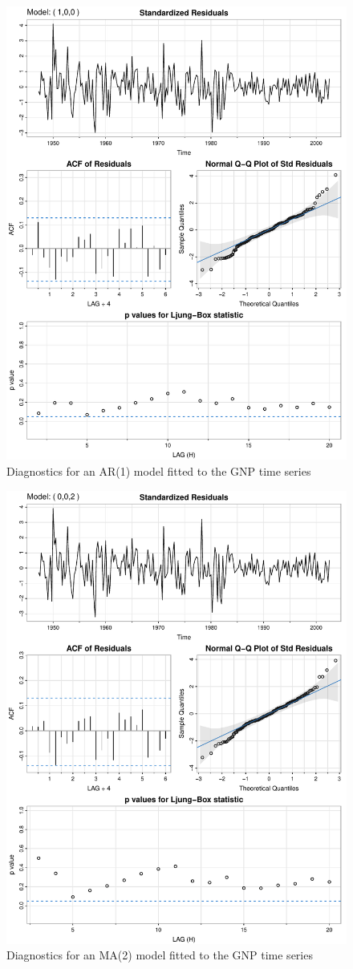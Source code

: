 \begin{figure}
\centering
\includegraphics[width=.75\textwidth]{figure24.pdf}
\caption{Diagnostics for an AR(1) model fitted to the GNP time series}
\label{fig:figure24}
\end{figure}

\begin{figure}
\centering
\includegraphics[width=.75\textwidth]{figure25.pdf}
\caption{Diagnostics for an MA(2) model fitted to the GNP time series}
\label{fig:figure25}
\end{figure}

